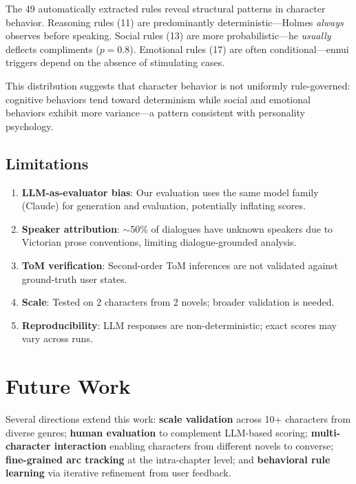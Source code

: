 \documentclass[11pt,a4paper]{article}
\begin{document}
The 49 automatically extracted rules reveal structural patterns in character behavior.
Reasoning rules (11) are predominantly deterministic---Holmes \textit{always} observes before speaking.
Social rules (13) are more probabilistic---he \textit{usually} deflects compliments ($p=0.8$).
Emotional rules (17) are often conditional---ennui triggers depend on the absence of stimulating cases.

This distribution suggests that character behavior is not uniformly rule-governed: cognitive behaviors tend toward determinism while social and emotional behaviors exhibit more variance---a pattern consistent with personality psychology.

\subsection{Limitations}
\label{sec:limitations}

\begin{enumerate}
\setlength\itemsep{0pt}
\item \textbf{LLM-as-evaluator bias}: Our evaluation uses the same model family (Claude) for generation and evaluation, potentially inflating scores.
\item \textbf{Speaker attribution}: $\sim$50\% of dialogues have unknown speakers due to Victorian prose conventions, limiting dialogue-grounded analysis.
\item \textbf{ToM verification}: Second-order ToM inferences are not validated against ground-truth user states.
\item \textbf{Scale}: Tested on 2 characters from 2 novels; broader validation is needed.
\item \textbf{Reproducibility}: LLM responses are non-deterministic; exact scores may vary across runs.
\end{enumerate}

\section{Future Work}
\label{sec:future}

Several directions extend this work:
\textbf{scale validation} across 10+ characters from diverse genres;
\textbf{human evaluation} to complement LLM-based scoring;
\textbf{multi-character interaction} enabling characters from different novels to converse;
\textbf{fine-grained arc tracking} at the intra-chapter level; and
\textbf{behavioral rule learning} via iterative refinement from user feedback.
\end{document}
